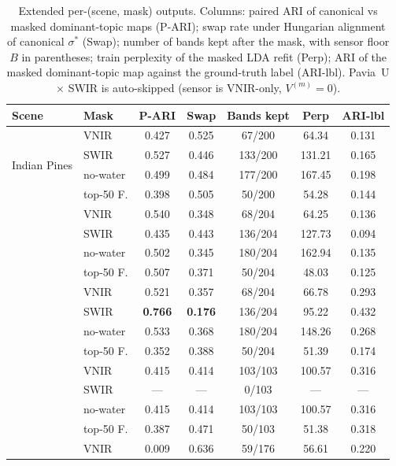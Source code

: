\documentclass[11pt,a4paper]{article}
\begin{document}
\begin{table}[t]
\caption{Extended per-(scene, mask) outputs. Columns: paired ARI of
canonical vs masked dominant-topic maps (P-ARI); swap rate under
Hungarian alignment of canonical $\sigma^*$ (Swap); number of bands
kept after the mask, with sensor floor $B$ in parentheses; train
perplexity of the masked LDA refit (Perp); ARI of the masked
dominant-topic map against the ground-truth label (ARI-lbl). Pavia~U
$\times$ SWIR is auto-skipped (sensor is VNIR-only, $V^{(m)} = 0$).}
\label{tab:full-labelled}
\centering
\small
\begin{tabular}{ll c c c c c}
\toprule
Scene & Mask & P-ARI & Swap & Bands kept & Perp & ARI-lbl \\
\midrule
\multirow{4}{*}{Indian Pines}
  & VNIR        & 0.427 & 0.525 & 67/200  & 64.34  & 0.131 \\
  & SWIR        & 0.527 & 0.446 & 133/200 & 131.21 & 0.165 \\
  & no-water    & 0.499 & 0.484 & 177/200 & 167.45 & 0.198 \\
  & top-50 F.   & 0.398 & 0.505 & 50/200  & 54.28  & 0.144 \\
\addlinespace
\multirow{4}{*}{Salinas}
  & VNIR        & 0.540 & 0.348 & 68/204  & 64.25  & 0.136 \\
  & SWIR        & 0.435 & 0.443 & 136/204 & 127.73 & 0.094 \\
  & no-water    & 0.502 & 0.345 & 180/204 & 162.94 & 0.135 \\
  & top-50 F.   & 0.507 & 0.371 & 50/204  & 48.03  & 0.125 \\
\addlinespace
\multirow{4}{*}{Salinas-A}
  & VNIR        & 0.521 & 0.357 & 68/204  & 66.78  & 0.293 \\
  & SWIR        & \textbf{0.766} & \textbf{0.176} & 136/204 & 95.22 & 0.432 \\
  & no-water    & 0.533 & 0.368 & 180/204 & 148.26 & 0.268 \\
  & top-50 F.   & 0.352 & 0.388 & 50/204  & 51.39  & 0.174 \\
\addlinespace
\multirow{4}{*}{Pavia U}
  & VNIR        & 0.415 & 0.414 & 103/103 & 100.57 & 0.316 \\
  & SWIR        & ---   & ---   & 0/103   & ---    & ---    \\
  & no-water    & 0.415 & 0.414 & 103/103 & 100.57 & 0.316 \\
  & top-50 F.   & 0.387 & 0.471 & 50/103  & 51.38  & 0.318 \\
\addlinespace
\multirow{4}{*}{KSC}
  & VNIR        & 0.009 & 0.636 & 59/176  & 56.61  & 0.220 \\

\end{tabular}
\end{table}
\end{document}
